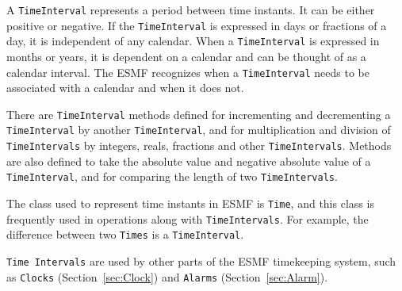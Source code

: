 
A {\tt TimeInterval} represents a period between time instants.  
It can be either positive or negative.  If the {\tt TimeInterval} 
is expressed in days or fractions of a day, it is independent of any 
calendar.  When a {\tt TimeInterval} is expressed in months or years, 
it is dependent on a calendar and can be thought of as a calendar 
interval.  The ESMF recognizes when a {\tt TimeInterval} needs to be 
associated with a calendar and when it does not.

There are {\tt TimeInterval} methods defined for incrementing and
decrementing a {\tt TimeInterval} by another {\tt TimeInterval},
and for multiplication and division of {\tt TimeIntervals} by integers, 
reals, fractions and other {\tt TimeIntervals}.  Methods are also 
defined to take the absolute value and negative absolute value of a 
{\tt TimeInterval}, and for comparing the length of two
{\tt TimeIntervals}.

The class used to represent time instants in ESMF is {\tt Time},
and this class is frequently used in operations along with 
{\tt TimeIntervals}.  For example, the difference between two
{\tt Times} is a {\tt TimeInterval}.  

{\tt Time Intervals} are used by other parts of the ESMF timekeeping
system, such as {\tt Clocks} (Section~\ref{sec:Clock}) and 
{\tt Alarms} (Section~\ref{sec:Alarm}).    





